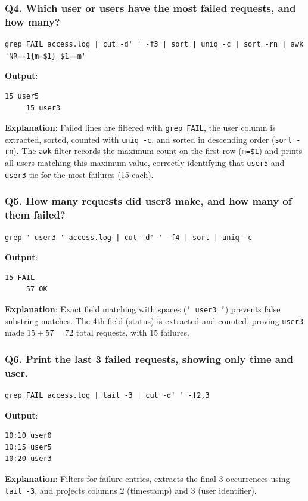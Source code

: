 \documentclass[12pt,a4paper]{article}
\begin{document}
\subsubsection*{Q4. Which user or users have the most failed requests, and how many?}
\begin{lstlisting}[style=bashstyle]
grep FAIL access.log | cut -d' ' -f3 | sort | uniq -c | sort -rn | awk 'NR==1{m=$1} $1==m'
\end{lstlisting}
\textbf{Output}:
\begin{lstlisting}[style=consolestyle]
     15 user5
     15 user3
\end{lstlisting}
\textbf{Explanation}: Failed lines are filtered with \texttt{grep FAIL}, the user column is extracted, sorted, counted with \texttt{uniq -c}, and sorted in descending order (\texttt{sort -rn}). The \texttt{awk} filter records the maximum count on the first row (\texttt{m=\$1}) and prints all users matching this maximum value, correctly identifying that \texttt{user5} and \texttt{user3} tie for the most failures (15 each).

\subsubsection*{Q5. How many requests did user3 make, and how many of them failed?}
\begin{lstlisting}[style=bashstyle]
grep ' user3 ' access.log | cut -d' ' -f4 | sort | uniq -c
\end{lstlisting}
\textbf{Output}:
\begin{lstlisting}[style=consolestyle]
     15 FAIL
     57 OK
\end{lstlisting}
\textbf{Explanation}: Exact field matching with spaces (\texttt{' user3 '}) prevents false substring matches. The 4th field (status) is extracted and counted, proving \texttt{user3} made $15 + 57 = 72$ total requests, with 15 failures.

\subsubsection*{Q6. Print the last 3 failed requests, showing only time and user.}
\begin{lstlisting}[style=bashstyle]
grep FAIL access.log | tail -3 | cut -d' ' -f2,3
\end{lstlisting}
\textbf{Output}:
\begin{lstlisting}[style=consolestyle]
10:10 user0
10:15 user5
10:20 user3
\end{lstlisting}
\textbf{Explanation}: Filters for failure entries, extracts the final 3 occurrences using \texttt{tail -3}, and projects columns 2 (timestamp) and 3 (user identifier).
\end{document}
